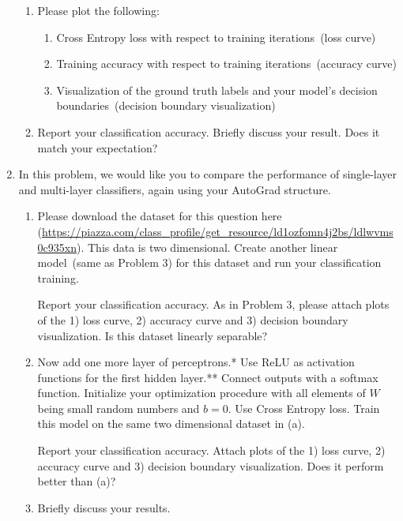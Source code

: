 \documentclass[a4paper]{article}
\begin{document}
\begin{enumerate}
\begin{enumerate}
	\item Please plot the following:
	\begin{enumerate}
		\item Cross Entropy loss with respect to training iterations~(loss curve) 
		\item Training accuracy with respect to training iterations~(accuracy curve)
		\item Visualization of the ground truth labels and your model's decision boundaries~(decision boundary visualization)
	\end{enumerate}
	\item Report your classification accuracy. Briefly discuss your result. Does it match your expectation?
\end{enumerate}

\item	In this problem, we would like you to compare the performance of single-layer and multi-layer classifiers, again using your AutoGrad structure.
	\begin{enumerate}
		\item Please download the dataset for this question here (\url{https://piazza.com/class_profile/get_resource/ld1ozfomn4j2bs/ldlwvms0c935xn}). This data is two dimensional. Create another linear model~(same as Problem 3) for this dataset and run your classification training. 
		
		Report your classification accuracy. As in Problem 3, please attach plots of the 1) loss curve, 2) accuracy curve and 3) decision boundary visualization. Is this dataset linearly separable?
		
		\item Now add one more layer of perceptrons.* Use ReLU as activation functions for the first hidden layer.** Connect outputs with a softmax function. Initialize your optimization procedure with all elements of $W$ being small random numbers and $b=0$. Use Cross Entropy loss. Train this model on the same two dimensional dataset in (a).
		
		Report your classification accuracy. Attach plots of the 1) loss curve, 2) accuracy curve and 3) decision boundary visualization. Does it perform better than (a)?
		
		\item Briefly discuss your results.
	
	\end{enumerate}
	

\end{enumerate}
\end{document}
